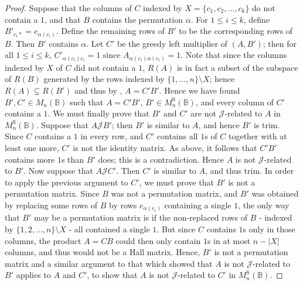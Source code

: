 \documentclass[11pt]{article}
\numberwithin{equation}{section}
\newcommand{\B}{\mathbb{B}}
\newcommand{\Bn}{M_n(\B)}
\newcommand{\Halln}{M_n^{\text{S}}(\B)}
\newcommand{\J}{\mathscr{J}}
\begin{document}
\begin{proof}
  Suppose that the columns of $C$ indexed by $X = \{c_1, c_2, \ldots, c_k\}$ do
  not contain a $1$, and that $B$ contains the permutation $\alpha$. For $1 \leq
  i \leq k$, define $B'_{c_i*} = e_{\alpha(c_i)}$. Define the remaining rows of
  $B'$ to be the corresponding rows of $B$. Then $B'$ contains $\alpha$. Let
  $C'$ be the greedy left multiplier of $(A, B')$; then for all $1 \leq i \leq
  k$, $C'_{\alpha(c_i)c_i} = 1$ since $A_{\alpha(c_i)\alpha(c_i)} = 1$. Note
  that since the columns indexed by $X$ of $C$ did not contain a $1$, $R(A)$ is
  in fact a subset of the subspace of $R(B)$ generated by the rows indexed by
  $\{1, \ldots, n\}\setminus X$; hence $R(A) \subsetneq R(B')$ and thus by
  , $A = C'B'$. Hence we have found $B', C' \in \Bn$
  such that $A = C'B'$, $B' \in \Halln$, and every column of $C'$ contains a
  $1$. We must finally prove that $B'$ and $C'$ are not $\J$-related to $A$ in
  $\Halln$. Suppose that $A \J B'$; then $B'$ is similar to $A$, and hence $B'$
  is trim. Since $C$ contains a $1$ in every row, and $C'$ contains all $1$s of
  $C$ together with at least one more, $C'$ is not the identity matrix.
  As above, it follows that $C'B'$ contains more $1$s than $B'$ does; this is a
  contradiction. Hence $A$ is not $\J$-related to $B'$. Now suppose that $A\J
  C'$. Then $C'$ is similar to $A$, and thus trim.
  In order to apply the previous argument to $C'$, we must prove that $B'$ is
  not a permutation matrix. Since $B$ was not a permutation matrix, and $B'$ was
  obtained by replacing some rows of $B$ by rows $e_{\alpha(c_i)}$ containing a
  single $1$, the only way that $B'$ may be a permutation matrix is if the
  non-replaced rows of $B$ - indexed by $\{1, 2, \ldots, n\}\setminus X$ - all
  contained a single $1$.  But since $C$ contains $1$s only in those columns,
  the product $A = CB$ could then only contain $1$s in at most $n - |X|$
  columns, and thus would not be a Hall matrix.  Hence, $B'$ is not a
  permutation matrix and a similar argument to that which showed that $A$ is not
  $\J$-related to $B'$ applies to $A$ and $C'$, to show that $A$ is not
  $\J$-related to $C'$ in $\Halln$.
\end{proof}



\end{document}
